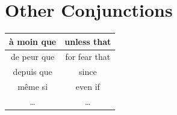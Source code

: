 \documentclass{book}
\begin{document}
    \section{Other Conjunctions}
        \begin{center}
            \begin{tabular}{|c|c|}
                \hline
                à moin que & unless that \\
                \hline
                de peur que & for fear that \\
                \hline
                depuis que & since \\
                \hline
                même si & even if \\
                \hline
                \dots & \dots \\
                \hline
            \end{tabular}
        \end{center}
\end{document}
